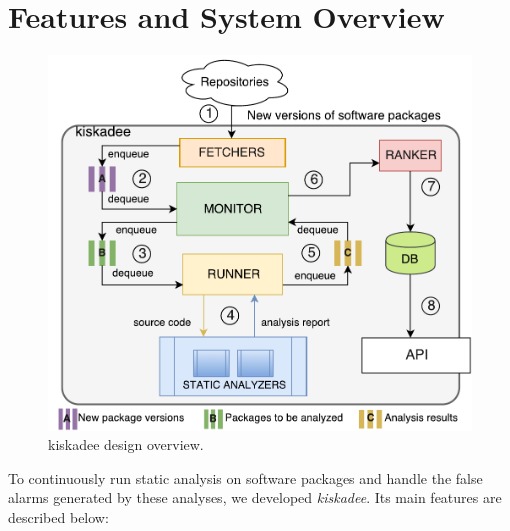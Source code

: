 \section{Features and System Overview}

\begin{figure}[hbt]
\centering
\includegraphics[width=.7\textwidth]{figures/kiskadee-overview.pdf}
  \caption{kiskadee design overview.}\label{fig:kiskadee:overview}
\end{figure}

To continuously run static analysis on software packages and handle the false
alarms generated by these analyses, we developed \textit{kiskadee}. Its main features are described below:

